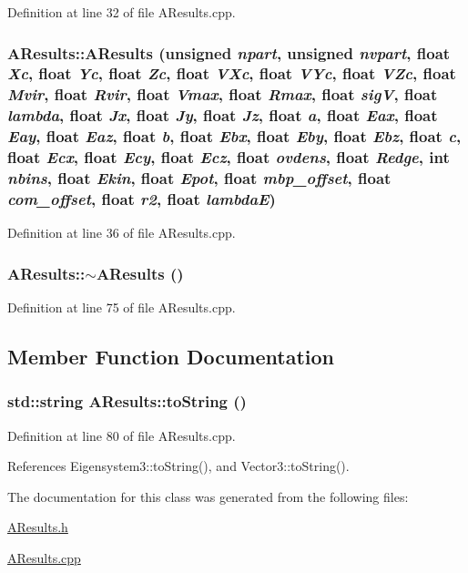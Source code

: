 Definition at line 32 of file AResults.cpp.

\subsubsection[{AResults}]{\setlength{\rightskip}{0pt plus 5cm}AResults::AResults (unsigned {\em npart}, \/  unsigned {\em nvpart}, \/  float {\em Xc}, \/  float {\em Yc}, \/  float {\em Zc}, \/  float {\em VXc}, \/  float {\em VYc}, \/  float {\em VZc}, \/  float {\em Mvir}, \/  float {\em Rvir}, \/  float {\em Vmax}, \/  float {\em Rmax}, \/  float {\em sigV}, \/  float {\em lambda}, \/  float {\em Jx}, \/  float {\em Jy}, \/  float {\em Jz}, \/  float {\em a}, \/  float {\em Eax}, \/  float {\em Eay}, \/  float {\em Eaz}, \/  float {\em b}, \/  float {\em Ebx}, \/  float {\em Eby}, \/  float {\em Ebz}, \/  float {\em c}, \/  float {\em Ecx}, \/  float {\em Ecy}, \/  float {\em Ecz}, \/  float {\em ovdens}, \/  float {\em Redge}, \/  int {\em nbins}, \/  float {\em Ekin}, \/  float {\em Epot}, \/  float {\em mbp\_\-offset}, \/  float {\em com\_\-offset}, \/  float {\em r2}, \/  float {\em lambdaE})}\label{classAResults_acd4e9125d1faa207580f1f926235a0f8}


Definition at line 36 of file AResults.cpp.

\subsubsection[{$\sim$AResults}]{\setlength{\rightskip}{0pt plus 5cm}AResults::$\sim$AResults ()}\label{classAResults_aee48c3e18ec0c623fc67e145eb686969}


Definition at line 75 of file AResults.cpp.



\subsection{Member Function Documentation}
\subsubsection[{toString}]{\setlength{\rightskip}{0pt plus 5cm}std::string AResults::toString ()}\label{classAResults_a5cbf739d3059e7a97d223c8e0826b092}


Definition at line 80 of file AResults.cpp.



References Eigensystem3::toString(), and Vector3::toString().



The documentation for this class was generated from the following files:\begin{DoxyCompactItemize}
\item 
\hyperlink{AResults_8h}{AResults.h}\item 
\hyperlink{AResults_8cpp}{AResults.cpp}\end{DoxyCompactItemize}
